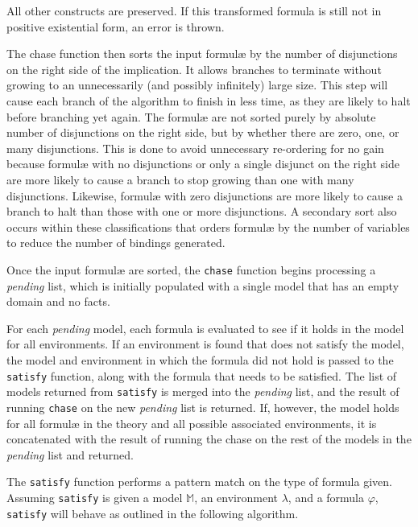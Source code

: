 		All other constructs are preserved. If this transformed formula is still
		not in positive existential form, an error is thrown.

		The chase function then sorts the input formul{\ae} by the number of
		disjunctions on the right side of the implication. It allows branches to
		terminate without growing to an unnecessarily (and possibly infinitely)
		large size. This step will cause each branch of the algorithm to finish in
		less time, as they are likely to halt before branching yet again. The
		formul{\ae} are not sorted purely by absolute number of disjunctions on the
		right side, but by whether there are zero, one, or many disjunctions. This
		is done to avoid unnecessary re-ordering for no gain because formul{\ae}
		with no disjunctions or only a single disjunct on the right side are more
		likely to cause a branch to stop growing than one with many disjunctions.
		Likewise, formul{\ae} with zero disjunctions are more likely to cause a
		branch to halt than those with one or more disjunctions. A secondary sort
		also occurs within these classifications that orders formul{\ae} by the
		number of variables to reduce the number of bindings generated.

		Once the input formul{\ae} are sorted, the {\tt chase} function begins
		processing a \emph{pending} list, which is initially populated with a
		single model that has an empty domain and no facts.

		For each \emph{pending} model, each formula is evaluated to see if it holds
		in the model for all environments. If an environment is found that does not
		satisfy the model, the model and environment in which the formula did not
		hold is passed to the {\tt satisfy} function, along with the formula that needs
		to be satisfied. The list of models returned from {\tt satisfy} is merged into
		the \emph{pending} list, and the result of running {\tt chase} on the new
		\emph{pending} list is returned. If, however, the model holds for all
		formul{\ae} in the theory and all possible associated environments, it is
		concatenated with the result of running the chase on the rest of the models
		in the \emph{pending} list and returned.

		The {\tt satisfy} function performs a pattern match on the type of formula
		given. Assuming {\tt satisfy} is given a model $\mathbb{M}$, an environment
		$\lambda$, and a formula $\varphi$, {\tt satisfy} will behave as outlined
		in the following algorithm.

		~\\

